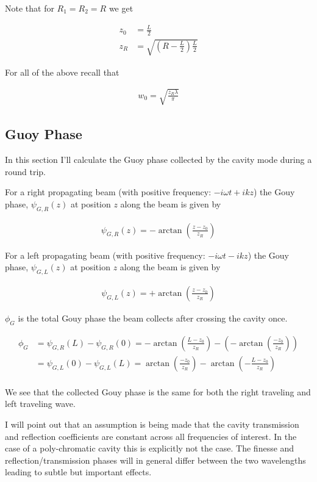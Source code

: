 \documentclass[12pt]{article}
\begin{document}
Note that for $R_1 = R_2 = R$ we get

\begin{align}
z_0 &= \frac{L}{2}\\
z_R &= \sqrt{\left(R-\frac{L}{2}\right)\frac{L}{2}}
\end{align}

For all of the above recall that 

\begin{align}
w_0 = \sqrt{\frac{z_R \lambda}{\pi}}
\end{align}

\subsection{Guoy Phase}

In this section I'll calculate the Guoy phase collected by the cavity mode during a round trip.


For a right propagating beam (with positive frequency: $-i \omega t + i kz$) the Gouy phase, $\psi_{G,R}(z)$ at position $z$ along the beam is given by

\begin{align}
\psi_{G,R}(z) = -\arctan\left(\frac{z-z_0}{z_R} \right)
\end{align}

For a left propagating beam (with positive frequency: $-i \omega t - i kz$) the Gouy phase, $\psi_{G,L}(z)$ at position $z$ along the beam is given by

\begin{align}
\psi_{G,L}(z) = +\arctan\left(\frac{z-z_0}{z_R} \right)
\end{align}

$\phi_G$ is the total Gouy phase the beam collects after crossing the cavity once.

\begin{align}
\phi_G &= \psi_{G,R}(L) - \psi_{G,R}(0) = -\arctan\left(\frac{L-z_0}{z_R} \right) - \left(-\arctan\left(\frac{-z_0}{z_R} \right)\right)\\
&= \psi_{G,L}(0) - \psi_{G,L}(L) = \arctan\left(\frac{-z_0}{z_R} \right) - \arctan\left(-\frac{L-z_0}{z_R} \right)\\
\end{align}

We see that the collected Gouy phase is the same for both the right traveling and left traveling wave.

I will point out that an assumption is being made that the cavity transmission and reflection coefficients are constant across all frequencies of interest. In the case of a poly-chromatic cavity this is explicitly not the case. The finesse and reflection/transmission phases will in general differ between the two wavelengths leading to subtle but important effects.
\end{document}
